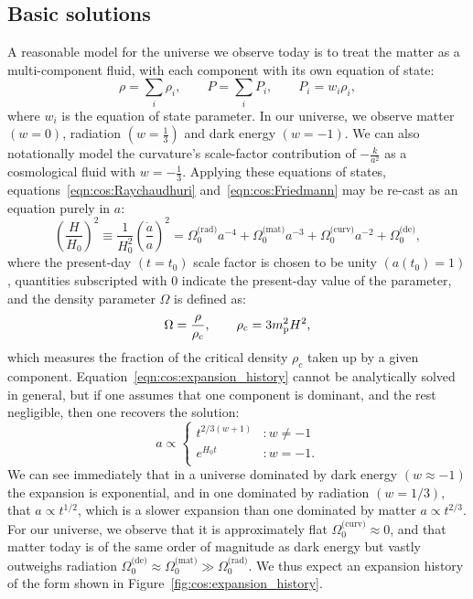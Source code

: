 \subsection{Basic solutions}
A reasonable model for the universe we observe today is to treat the matter as a multi-component fluid, with each component with its own equation of state:
\begin{equation}
  \rho = \sum_i \rho_i, \qquad P = \sum_i P_i, \qquad P_i = w_i \rho_i,
  \label{eqn:cos:multi_component}
\end{equation}
where $w_i$ is the equation of state parameter. In our universe, we observe matter $(w=0)$, radiation $(w=\frac{1}{3})$ and dark energy $(w=-1)$. We can also notationally model the curvature's scale-factor contribution of $-\frac{k}{a^2}$ as a cosmological fluid with $w=-\frac{1}{3}$. Applying these equations of states, equations~\eqref{eqn:cos:Raychaudhuri} and~\eqref{eqn:cos:Friedmann} may be re-cast as an equation purely in $a$:
\begin{equation}
  {\left( \frac{H}{H_0} \right)}^2 \equiv 
  \frac{1}{H_0^2}{\left( \frac{\dot{a}}{a} \right)}^2 =
  \Omega^\text{(rad)}_0 a^{-4} +
  \Omega^\text{(mat)}_0 a^{-3} + 
  \Omega^\text{(curv)}_0 a^{-2} +
  \Omega^\text{(de)}_0,
  \label{eqn:cos:expansion_history}
\end{equation}
where the present-day $(t=t_0)$ scale factor is chosen to be unity $(a(t_0)=1)$, quantities subscripted with $0$ indicate the present-day  value of the parameter, and the density parameter $\Omega$ is defined as:
\begin{equation}
  \Omega = \frac{\rho}{\rho_\mathrm{c}}, \qquad \rho_\mathrm{c} = {3m_{\mathrm{p}}^2H^2},
  \label{eqn:cos:omega_def}
\end{equation}
which measures the fraction of the critical density $\rho_c$ taken up by a given component. Equation~\eqref{eqn:cos:expansion_history} cannot be analytically solved in general, but if one assumes that one component is dominant, and the rest negligible, then one recovers the solution:
\begin{equation}
  a  \propto
  \left\{
  \begin{array}{ll}
    t^{2/3(w+1)} &: w\ne-1\\
    e^{H_0 t} &: w=-1.\\
  \end{array}
  \right.
\end{equation}
We can see immediately that in a universe dominated by dark energy ${(w\approx-1)}$ the expansion is exponential, and in one dominated by radiation ${(w=1/3)}$, that ${a\propto t^{1/2}}$, which is a slower expansion than one dominated by matter ${a\propto t^{2/3}}$. For our universe, we observe that it is approximately flat ${\Omega_0^{\text{(curv)}}\approx0}$, and that matter today is of the same order of magnitude as dark energy but vastly outweighs radiation ${\Omega_0^{\text{(de)}} \approx \Omega_0^{\text{(mat)}} \gg \Omega_0^{\text{(rad)}}}$. We thus expect an expansion history of the form shown in Figure~\ref{fig:cos:expansion_history}.

